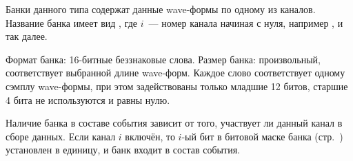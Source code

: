 Банки данного типа  содержат данные wave-формы по одному из каналов. Название банка имеет вид , где $i$~--- номер канала начиная с нуля, например ,  и так далее.

Формат банка: 16-битные беззнаковые слова. Размер банка: произвольный, соответствует выбранной длине wave-форм. Каждое слово соответствует одному сэмплу wave-формы, при этом задействованы только младшие 12 битов, старшие 4 бита не используются и равны нулю.

Наличие банка в составе события зависит от того, участвует ли данный канал в сборе данных. Если канал $i$ включён, то $i$-ый бит в битовой маске банка  (стр.~\pageref{sec_bank_info}) установлен в единицу, и банк  входит в состав события.













%

